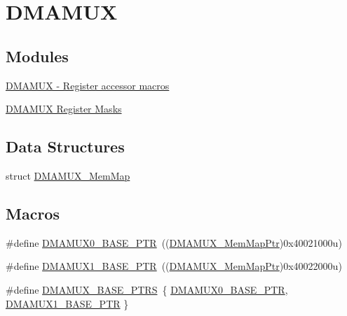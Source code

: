 \hypertarget{group___d_m_a_m_u_x___peripheral}{}\section{D\+M\+A\+M\+U\+X}
\label{group___d_m_a_m_u_x___peripheral}
\subsection*{Modules}
\begin{DoxyCompactItemize}
\item 
\hyperlink{group___d_m_a_m_u_x___register___accessor___macros}{D\+M\+A\+M\+U\+X -\/ Register accessor macros}
\item 
\hyperlink{group___d_m_a_m_u_x___register___masks}{D\+M\+A\+M\+U\+X Register Masks}
\end{DoxyCompactItemize}
\subsection*{Data Structures}
\begin{DoxyCompactItemize}
\item 
struct \hyperlink{struct_d_m_a_m_u_x___mem_map}{D\+M\+A\+M\+U\+X\+\_\+\+Mem\+Map}
\end{DoxyCompactItemize}
\subsection*{Macros}
\begin{DoxyCompactItemize}
\item 
\#define \hyperlink{group___d_m_a_m_u_x___peripheral_ga403b61d306820e4e1113c636300004a3}{D\+M\+A\+M\+U\+X0\+\_\+\+B\+A\+S\+E\+\_\+\+P\+T\+R}~((\hyperlink{group___d_m_a_m_u_x___peripheral_ga736ab5b1ed284b3b4fdb63010a576777}{D\+M\+A\+M\+U\+X\+\_\+\+Mem\+Map\+Ptr})0x40021000u)
\item 
\#define \hyperlink{group___d_m_a_m_u_x___peripheral_gad6b43366c6448bd157f17be565d8e1f3}{D\+M\+A\+M\+U\+X1\+\_\+\+B\+A\+S\+E\+\_\+\+P\+T\+R}~((\hyperlink{group___d_m_a_m_u_x___peripheral_ga736ab5b1ed284b3b4fdb63010a576777}{D\+M\+A\+M\+U\+X\+\_\+\+Mem\+Map\+Ptr})0x40022000u)
\item 
\#define \hyperlink{group___d_m_a_m_u_x___peripheral_gaad218c12978071501dc2899f0624de4b}{D\+M\+A\+M\+U\+X\+\_\+\+B\+A\+S\+E\+\_\+\+P\+T\+R\+S}~\{ \hyperlink{group___d_m_a_m_u_x___peripheral_ga403b61d306820e4e1113c636300004a3}{D\+M\+A\+M\+U\+X0\+\_\+\+B\+A\+S\+E\+\_\+\+P\+T\+R}, \hyperlink{group___d_m_a_m_u_x___peripheral_gad6b43366c6448bd157f17be565d8e1f3}{D\+M\+A\+M\+U\+X1\+\_\+\+B\+A\+S\+E\+\_\+\+P\+T\+R} \}
\end{DoxyCompactItemize}
